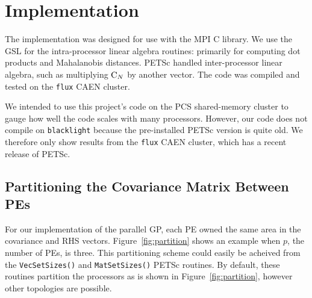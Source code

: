 \section{Implementation}
\label{sec:implementation}

The implementation was designed for use with the \ac{MPI} C library.  We use the \ac{GSL}
for the intra-processor linear algebra routines: primarily for computing dot products and
Mahalanobis distances.  PETSc handled inter-processor linear algebra, such as multiplying
$\mathrm{C}_N$ by another vector.  The code was compiled and tested on the \texttt{flux} CAEN
cluster.

We intended to use this project's code on the PCS shared-memory cluster to gauge how well
the code scales with many processors.  However, our code does not compile on
\texttt{blacklight} because the pre-installed PETSc version is quite old.  We therefore
only show results from the \texttt{flux} CAEN cluster, which has a recent release of
PETSc.


\subsection{Partitioning the Covariance Matrix Between \acp{PE}}
\label{sub:partitioningthecovariancematrix}

For our implementation of the parallel \ac{GP}, each \ac{PE} owned the same area in the
covariance and \ac{RHS} vectors.  Figure~\ref{fig:partition} shows an example when $p$,
the number of \acp{PE}, is three.  This partitioning scheme could easily be acheived from
the \texttt{VecSetSizes()} and \texttt{MatSetSizes()} \ac{PETSc} routines.  By default,
these routines partition the processors as is shown in Figure~\ref{fig:partition}, however
other topologies are possible.

